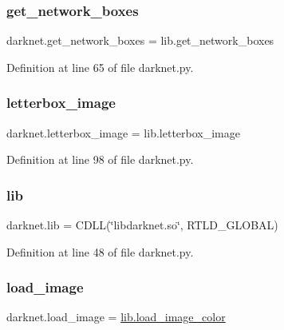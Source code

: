 \subsubsection{\texorpdfstring{get\_network\_boxes}{get\_network\_boxes}}
{\footnotesize\ttfamily darknet.\+get\+\_\+network\+\_\+boxes = lib.\+get\+\_\+network\+\_\+boxes}



Definition at line 65 of file darknet.\+py.

\mbox{\label{namespacedarknet_aa8b324fa30fff311e68940259d0862d6}} 
\subsubsection{\texorpdfstring{letterbox\_image}{letterbox\_image}}
{\footnotesize\ttfamily darknet.\+letterbox\+\_\+image = lib.\+letterbox\+\_\+image}



Definition at line 98 of file darknet.\+py.

\mbox{\label{namespacedarknet_ab817163f62e1395d5b07a0efe5a9a5ba}} 
\subsubsection{\texorpdfstring{lib}{lib}}
{\footnotesize\ttfamily darknet.\+lib = C\+D\+LL(\char`\"{}libdarknet.\+so\char`\"{}, R\+T\+L\+D\+\_\+\+G\+L\+O\+B\+AL)}



Definition at line 48 of file darknet.\+py.

\mbox{\label{namespacedarknet_abdfbf2bd90fef694ab30ca75879a5f27}} 
\subsubsection{\texorpdfstring{load\_image}{load\_image}}
{\footnotesize\ttfamily darknet.\+load\+\_\+image = \mbox{\hyperlink{image_8c_a233b57091bac94f82d8aa0d8a5c1f070}{lib.\+load\+\_\+image\+\_\+color}}}



